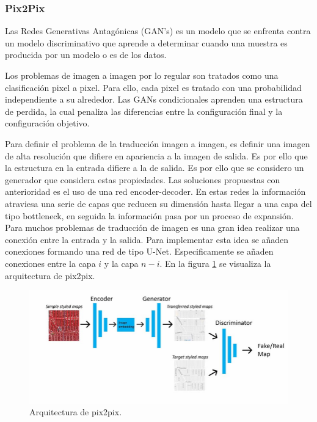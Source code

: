 \subsubsection{Pix2Pix}


Las Redes Generativas Antagónicas (GAN's) es un modelo que se enfrenta contra un modelo discriminativo que aprende a determinar cuando una muestra es producida por un modelo o es de los datos.


Los problemas de imagen a imagen por lo regular son tratados como una clasificación pixel a pixel. Para ello, cada pixel es tratado con una probabilidad independiente a su alrededor. Las GANs condicionales aprenden una estructura de perdida, la cual penaliza las diferencias entre la configuración final y la configuración objetivo.


Para definir el problema de la traducción imagen a imagen, es definir una imagen de alta resolución que difiere en apariencia a la imagen de salida. Es por ello que la estructura en la entrada difiere a la de salida. Es por ello que se considero un generador que considera estas propiedades. Las soluciones propuestas con anterioridad es el uso de una red encoder-decoder.  En estas redes la información atraviesa una serie de capas que reducen su dimensión hasta llegar a una capa del tipo bottleneck, en seguida la información pasa por un proceso de expansión. Para muchos problemas de traducción de imagen es una gran idea realizar una conexión entre la entrada y la salida. Para implementar esta idea se añaden conexiones formando una red de tipo U-Net. Especificamente se añaden conexiones entre la capa $i$ y la capa $n-i$. En la figura \ref{fig:pix2pix} se visualiza la arquitectura de pix2pix.

\begin{figure}[H]
    \centering
    \includegraphics[width=16cm]{Graphics/pix2pix.jpg}
    \caption{Arquitectura de pix2pix\cite{Salimans_2016}.}
    \label{fig:pix2pix}
\end{figure}